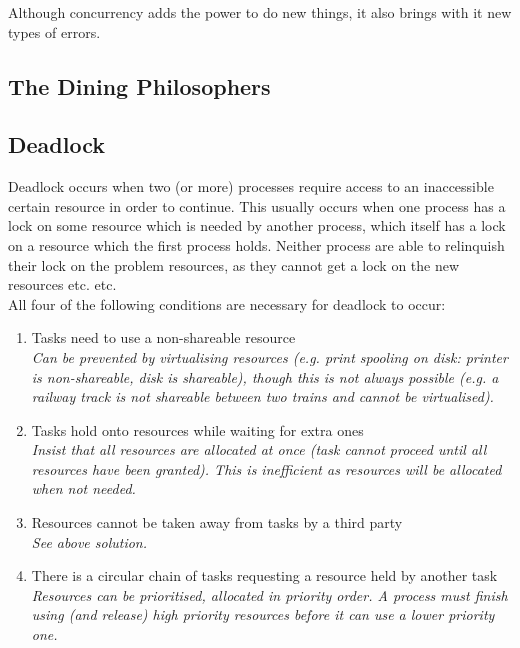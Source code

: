 \documentclass[a4paper,oneside]{report}
\begin{document}
  	Although concurrency adds the power to do new things, it also brings with it new types of errors.
  	
    	\subsection{The Dining Philosophers}
    	
    	
    	\subsection{Deadlock}
    	Deadlock occurs when two (or more) processes require access to an inaccessible certain resource in order to continue. This usually occurs when one process has a lock on some resource which is needed by another process, which itself has a lock on a resource which the first process holds. Neither process are   able to relinquish their lock on the problem resources, as they cannot get a lock on the new resources etc. etc.\\
    	
    	\noindent All four of the following conditions are necessary for deadlock to occur: 
    	\begin{enumerate}
    		\item Tasks need to use a non-shareable resource\\ 
    			  \emph{Can be prevented by virtualising resources (e.g. print spooling on disk: printer is non-shareable, disk is shareable), though this is not always possible (e.g. a railway track is not shareable between two trains and cannot be virtualised).}
    		\item Tasks hold onto resources while waiting for extra ones\\
    			  \emph{Insist that all resources are allocated at once (task cannot proceed until all resources have been granted). This is inefficient as resources will be allocated when not needed.}
    		\item Resources cannot be taken away from tasks by a third party\\
    			  \emph{See above solution.}
    		\item There is a circular chain of tasks requesting a resource held by another task\\
    			  \emph{Resources can be prioritised, allocated in priority order. A process must finish using (and release) high priority resources before it can use a lower priority one.}
    	\end{enumerate}
    	
\end{document}
